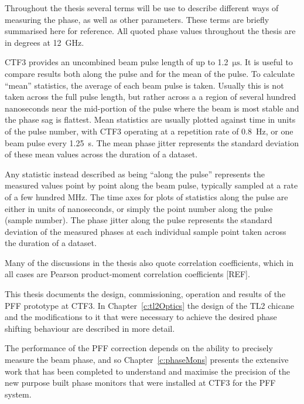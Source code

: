 
Throughout the thesis several terms will be use to describe different ways of measuring the phase, as well as other parameters. These terms are briefly summarised here for reference. All quoted phase values throughout the thesis are in degrees at 12~GHz.

CTF3 provides an uncombined beam pulse length of up to 1.2~\(\mathrm{\mu s}\). It is useful to compare results both along the pulse and for the mean of the pulse. To calculate ``mean'' statistics, the average of each beam pulse is taken. Usually this is not taken across the full pulse length, but rather across a a region of several hundred nanoseconds near the mid-portion of the pulse where the beam is most stable and the phase sag is flattest. Mean statistics are usually plotted against time in units of the pulse number, with CTF3 operating at a repetition rate of 0.8~Hz, or one beam pulse every 1.25~s. The mean phase jitter represents the standard deviation of these mean values across the duration of a dataset.

Any statistic instead described as being ``along the pulse'' represents the measured values point by point along the beam pulse, typically sampled at a rate of a few hundred MHz. The time axes for plots of statistics along the pulse are either in units of nanoseconds, or simply the point number along the pulse (sample number). The phase jitter along the pulse represents the standard deviation of the measured phases at each individual sample point taken across the duration of a dataset.

Many of the discussions in the thesis also quote correlation coefficients, which in all cases are Pearson product-moment correlation coefficients [REF].


This thesis documents the design, commissioning, operation and results of the PFF prototype at CTF3. In Chapter~\ref{c:tl2Optics} the design of the TL2 chicane and the modifications to it that were necessary to achieve the desired phase shifting behaviour are described in more detail. 

The performance of the PFF correction depends on the ability to precisely measure the beam phase, and so Chapter~\ref{c:phaseMons} presents the extensive work that has been completed to understand and maximise the precision of the new purpose built phase monitors that were installed at CTF3 for the PFF system. 

